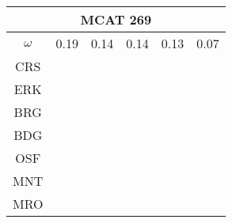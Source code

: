 \documentclass[a4paper,12pt]{article}
\begin{document}
\begin{tabular}{|c|c|c|c|c|c|}%
         \hline \multicolumn{6}{|c|}{MCAT 269} \\ \hline
         $\omega$&0.19&0.14&0.14&0.13&0.07\\ \hline %
        CRS&\cellcolor[HTML]{E41A1C}&\cellcolor[HTML]{E41A1C}&\cellcolor[HTML]{E41A1C}&\cellcolor[HTML]{E41A1C}&\cellcolor[HTML]{E41A1C}\\ \hline %
        ERK&\cellcolor[HTML]{E41A1C}&\cellcolor[HTML]{E41A1C}&\cellcolor[HTML]{E41A1C}&\cellcolor[HTML]{E41A1C}&\cellcolor[HTML]{E41A1C}\\ \hline %
        BRG&\cellcolor[HTML]{E41A1C}&\cellcolor[HTML]{E41A1C}&\cellcolor[HTML]{E41A1C}&\cellcolor[HTML]{E41A1C}&\cellcolor[HTML]{E41A1C}\\ \hline %
        BDG&\cellcolor[HTML]{377EB8}&\cellcolor[HTML]{377EB8}&\cellcolor[HTML]{377EB8}&\cellcolor[HTML]{377EB8}&\cellcolor[HTML]{377EB8}\\ \hline %
        OSF&\cellcolor[HTML]{377EB8}&\cellcolor[HTML]{377EB8}&\cellcolor[HTML]{377EB8}&\cellcolor[HTML]{377EB8}&\cellcolor[HTML]{377EB8}\\ \hline %
        MNT&\cellcolor[HTML]{377EB8}&\cellcolor[HTML]{377EB8}&\cellcolor[HTML]{377EB8}&\cellcolor[HTML]{377EB8}&\cellcolor[HTML]{377EB8}\\ \hline %
        MRO&\cellcolor[HTML]{4DAF4A}&\cellcolor[HTML]{4DAF4A}&\cellcolor[HTML]{4DAF4A}&\cellcolor[HTML]{4DAF4A}&\cellcolor[HTML]{4DAF4A}\\ \hline %

\end{tabular}
\end{document}
